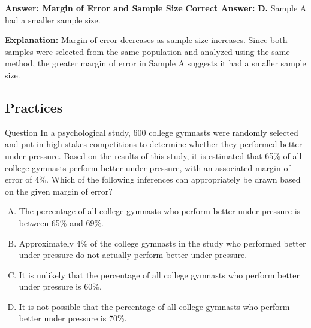 \documentclass{beamer}
\begin{document}
\begin{frame}{\textbf{Answer: Margin of Error and Sample Size}}
\textbf{Correct Answer:} \textbf{D.} Sample A had a smaller sample size.

\textbf{Explanation:} 
Margin of error decreases as sample size increases. Since both samples were selected from the same population and analyzed using the same method, the greater margin of error in Sample A suggests it had a smaller sample size.
\end{frame}



\begin{frame}
\section{Practices}
\end{frame}

\begin{frame}{Question}
In a psychological study, 600 college gymnasts were randomly selected and put in high-stakes competitions to determine whether they performed better under pressure. Based on the results of this study, it is estimated that 65\% of all college gymnasts perform better under pressure, with an associated margin of error of 4\%. Which of the following inferences can appropriately be drawn based on the given margin of error?

\begin{enumerate}[A.]
    \item The percentage of all college gymnasts who perform better under pressure is between 65\% and 69\%.
    \item Approximately 4\% of the college gymnasts in the study who performed better under pressure do not actually perform better under pressure.
    \item It is unlikely that the percentage of all college gymnasts who perform better under pressure is 60\%.
    \item It is not possible that the percentage of all college gymnasts who perform better under pressure is 70\%.
\end{enumerate}
\end{frame}
\end{document}
